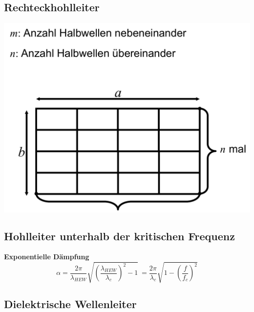 \subsection{Rechteckhohlleiter}
\includegraphics[width=.35\paperheight]{content/fuw/pictures/fuw_rechteckhohlleiter.png}
\subsection{Hohlleiter unterhalb der kritischen Frequenz}
\textbf{Exponentielle Dämpfung}
\[\alpha = \dfrac{2\pi}{\lambda_{HEW}} \sqrt{\left(\dfrac{\lambda_{HEW}}{\lambda_c}\right)^2 - 1}\
= \dfrac{2\pi}{\lambda_c} \sqrt{1 - \left(\frac{f}{f_c}\right)^2}\]
\subsection{Dielektrische Wellenleiter}

